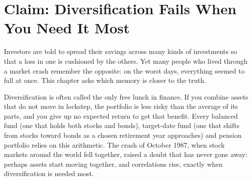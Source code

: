 \makeatletter
{}
\makeatother

\makeatletter
\makeatother

\chapter{Claim: Diversification Fails When You Need It Most}
\label{ch:13}

Investors are told to spread their savings across many kinds of investments so that a loss in one is cushioned by the others. Yet many people who lived through a market crash remember the opposite: on the worst days, everything seemed to fall at once. This chapter asks which memory is closer to the truth.

Diversification is often called the only free lunch in finance. If you combine assets that do not move in lockstep, the portfolio is less risky than the average of its parts, and you give up no expected return to get that benefit. Every balanced fund (one that holds both stocks and bonds), target-date fund (one that shifts from stocks toward bonds as a chosen retirement year approaches) and pension portfolio relies on this arithmetic. The crash of October 1987, when stock markets around the world fell together, raised a doubt that has never gone away: perhaps assets start moving together, and correlations rise, exactly when diversification is needed most.

